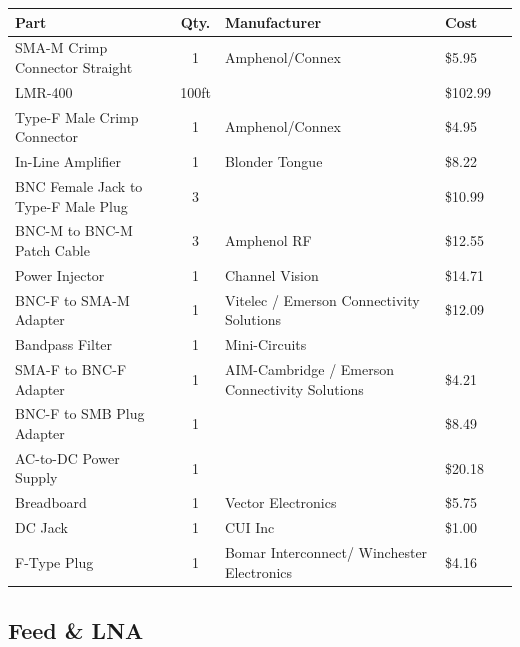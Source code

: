 \documentclass[11pt]{article} %
\begin{document}
\begin{tabular}{| p{6cm} | c | p{5cm} | l | c |}
\hline
\textbf{Part} & \textbf{Qty.} & \textbf{Manufacturer} & \textbf{Cost} \\ \hline \hline
SMA-M Crimp Connector Straight & 1 & Amphenol/Connex & \$5.95 \\ \hline
LMR-400 & 100ft & & \$102.99\\ \hline
Type-F Male Crimp Connector & 1 & Amphenol/Connex &\$4.95 \\ \hline
In-Line Amplifier & 1 & Blonder Tongue & \$8.22 \\ \hline
BNC Female Jack to Type-F Male Plug & 3 & & \$10.99 \\ \hline
BNC-M to BNC-M Patch Cable & 3 & Amphenol RF & \$12.55 \\ \hline
Power Injector & 1 & Channel Vision & \$14.71 \\ \hline
BNC-F to SMA-M Adapter & 1 & Vitelec / Emerson Connectivity Solutions & \$12.09 \\ \hline
Bandpass Filter & 1 & Mini-Circuits & \\ \hline
SMA-F to BNC-F Adapter & 1 & AIM-Cambridge / Emerson Connectivity Solutions & \$4.21 \\ \hline
BNC-F to SMB Plug Adapter & 1 & & \$8.49 \\ \hline
AC-to-DC Power Supply & 1 & & \$20.18 \\ \hline
Breadboard & 1 & Vector Electronics & \$5.75 \\ \hline
DC Jack & 1 & CUI Inc & \$1.00 \\ \hline
F-Type Plug & 1 & Bomar Interconnect/ Winchester Electronics & \$4.16\\ \hline
\end{tabular}

\subsection{Feed \& LNA}
\end{document}
